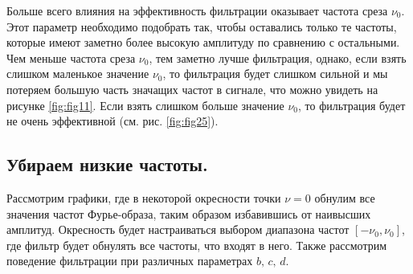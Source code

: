 \documentclass[a4paper, 12pt]{article}
\begin{document}
    Больше всего влияния на эффективность фильтрации оказывает частота среза $\nu_0$. Этот параметр необходимо подобрать
    так, чтобы оставались только те частоты, которые имеют заметно более высокую амплитуду по сравнению с остальными.
    Чем меньше частота среза $\nu_0$, тем заметно лучше фильтрация, однако, если взять слишком маленькое значение $\nu_0$,
    то фильтрация будет слишком сильной и мы потеряем большую часть значащих частот в сигнале, что можно увидеть на рисунке
    \ref{fig:fig11}. Если взять слишком больше значение $\nu_0$, то фильтрация будет не очень эффективной (см. рис. \ref{fig:fig25}).


    \subsection{Убираем низкие частоты.}
    Рассмотрим графики, где в некоторой окресности точки $\nu=0$ обнулим все значения частот Фурье-образа, таким образом избавившись
    от наивысших амплитуд. Окресность будет настраиваться выбором диапазона частот $[-\nu_0,\nu_0]$, где фильтр будет обнулять все частоты, 
    что входят в него. Также рассмотрим поведение фильтрации при различных параметрах $b,\,c,\,d$.
\end{document}
